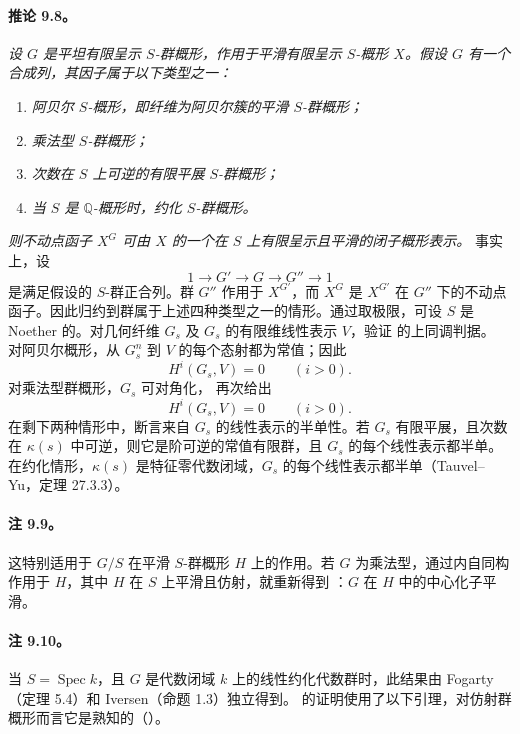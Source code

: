 \paragraph{\textbf{推论 9.8。}}
\emph{设 \(G\) 是平坦有限呈示 \(S\)-群概形，作用于平滑有限呈示 \(S\)-概形 \(X\)。假设 \(G\) 有一个合成列，其因子属于以下类型之一：}
\begin{enumerate}
\item[\emph{(1)}] \emph{阿贝尔 \(S\)-概形，即纤维为阿贝尔簇的平滑 \(S\)-群概形；}
\item[\emph{(2)}] \emph{乘法型 \(S\)-群概形；}
\item[\emph{(3)}] \emph{次数在 \(S\) 上可逆的有限平展 \(S\)-群概形；}
\item[\emph{(4)}] \emph{当 \(S\) 是 \(\mathbb Q\)-概形时，约化 \(S\)-群概形。}
\end{enumerate}
\emph{则不动点函子 \(X^G\) 可由 \(X\) 的一个在 \(S\) 上有限呈示且平滑的闭子概形表示。}
事实上，设
\[
  1\longrightarrow G'\longrightarrow G\longrightarrow G''
  \longrightarrow 1
\]
是满足假设的 \(S\)-群正合列。群 \(G''\) 作用于 \(X^{G'}\)，而 \(X^G\) 是 \(X^{G'}\) 在 \(G''\) 下的不动点函子。因此归约到群属于上述四种类型之一的情形。通过取极限，可设 \(S\) 是 Noether 的。对几何纤维 \(G_s\) 及 \(G_s\) 的有限维线性表示 \(V\)，验证 的上同调判据。
对阿贝尔概形，从 \(G_s^n\) 到 \(V\) 的每个态射都为常值；因此
\[
  H^i(G_s,V)=0\qquad(i>0).
\]
对乘法型群概形，\(G_s\) 可对角化， 再次给出
\[
  H^i(G_s,V)=0\qquad(i>0).
\]
在剩下两种情形中，断言来自 \(G_s\) 的线性表示的半单性。若 \(G_s\) 有限平展，且次数在 \(\kappa(s)\) 中可逆，则它是阶可逆的常值有限群，且 \(G_s\) 的每个线性表示都半单。在约化情形，\(\kappa(s)\) 是特征零代数闭域，\(G_s\) 的每个线性表示都半单（Tauvel--Yu，定理 27.3.3）。
\paragraph{\textbf{注 9.9。}}
这特别适用于 \(G/S\) 在平滑 \(S\)-群概形 \(H\) 上的作用。若 \(G\) 为乘法型，通过内自同构作用于 \(H\)，其中 \(H\) 在 \(S\) 上平滑且仿射，就重新得到 ：\(G\) 在 \(H\) 中的中心化子平滑。
\paragraph{\textbf{注 9.10。}}
当 \(S=\operatorname{Spec}k\)，且 \(G\) 是代数闭域 \(k\) 上的线性约化代数群时，此结果由 Fogarty（定理 5.4）和 Iversen（命题 1.3）独立得到。
 的证明使用了以下引理，对仿射群概形而言它是熟知的（）。
